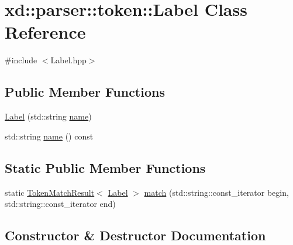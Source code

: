\hypertarget{classxd_1_1parser_1_1token_1_1_label}{}\section{xd\+:\+:parser\+:\+:token\+:\+:Label Class Reference}
\label{classxd_1_1parser_1_1token_1_1_label}


{\ttfamily \#include $<$Label.\+hpp$>$}

\subsection*{Public Member Functions}
\begin{DoxyCompactItemize}
\item 
\mbox{\hyperlink{classxd_1_1parser_1_1token_1_1_label_afff5fd4e6995b692b540af4d72e858ec}{Label}} (std\+::string \mbox{\hyperlink{classxd_1_1parser_1_1token_1_1_label_a3c34d9b8e6e7a2e522239b961c5342d9}{name}})
\item 
std\+::string \mbox{\hyperlink{classxd_1_1parser_1_1token_1_1_label_a3c34d9b8e6e7a2e522239b961c5342d9}{name}} () const
\end{DoxyCompactItemize}
\subsection*{Static Public Member Functions}
\begin{DoxyCompactItemize}
\item 
static \mbox{\hyperlink{namespacexd_1_1parser_1_1token_a766c52bbfb7cb1f08498ef0bb9ec756e}{Token\+Match\+Result}}$<$ \mbox{\hyperlink{classxd_1_1parser_1_1token_1_1_label}{Label}} $>$ \mbox{\hyperlink{classxd_1_1parser_1_1token_1_1_label_abce872395d469652fe1cacc29fab8a2c}{match}} (std\+::string\+::const\+\_\+iterator begin, std\+::string\+::const\+\_\+iterator end)
\end{DoxyCompactItemize}


\subsection{Constructor \& Destructor Documentation}
\mbox{\label{classxd_1_1parser_1_1token_1_1_label_afff5fd4e6995b692b540af4d72e858ec}} 
